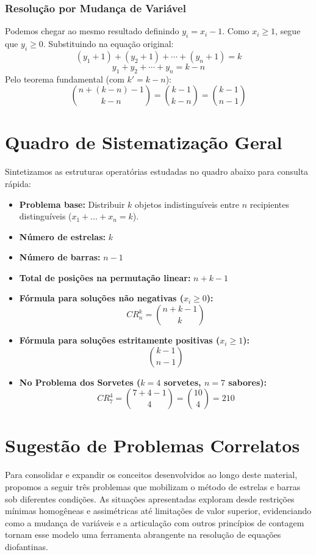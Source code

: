 \documentclass[12pt,a4paper]{report}
\begin{document}
	\subsection{Resolução por Mudança de Variável}
	Podemos chegar ao mesmo resultado definindo $y_i = x_i - 1$. Como $x_i \geqslant 1$, segue que $y_i \geqslant 0$.
	Substituindo na equação original:
	$$(y_1 + 1) + (y_2 + 1) + \cdots + (y_n + 1) = k$$
	$$y_1 + y_2 + \cdots + y_n = k - n$$
	Pelo teorema fundamental (com $k' = k - n$):
	$$\binom{n + (k - n) - 1}{k - n} = \binom{k - 1}{k - n} = \binom{k - 1}{n - 1}$$
	
	\chapter{Quadro de Sistematização Geral}
	\label{cap:sistematizacao}
	
	Sintetizamos as estruturas operatórias estudadas no quadro abaixo para consulta rápida:
	
	\begin{destaque}
		\begin{itemize}
			\item \textbf{Problema base:} Distribuir $k$ objetos indistinguíveis entre $n$ recipientes distinguíveis ($x_1 + \dots + x_n = k$).
			\item \textbf{Número de estrelas:} $k$
			\item \textbf{Número de barras:} $n - 1$
			\item \textbf{Total de posições na permutação linear:} $n + k - 1$
			\item \textbf{Fórmula para soluções não negativas ($x_i \geqslant 0$):}
			$$CR_n^k = \binom{n + k - 1}{k}$$
			\item \textbf{Fórmula para soluções estritamente positivas ($x_i \geqslant 1$):}
			$$\binom{k - 1}{n - 1}$$
			\item \textbf{No Problema dos Sorvetes ($k=4$ sorvetes, $n=7$ sabores):}
			$$CR_7^4 = \binom{7 + 4 - 1}{4} = \binom{10}{4} = 210$$
		\end{itemize}
	\end{destaque}
	
	\chapter{Sugestão de Problemas Correlatos}
	
	Para consolidar e expandir os conceitos desenvolvidos ao longo deste material, propomos a seguir três problemas que mobilizam o método de estrelas e barras sob diferentes condições. As situações apresentadas exploram desde restrições mínimas homogêneas e assimétricas até limitações de valor superior, evidenciando como a mudança de variáveis e a articulação com outros princípios de contagem tornam esse modelo uma ferramenta abrangente na resolução de equações diofantinas. 
	
\end{document}

